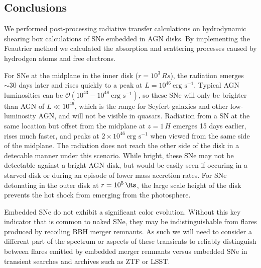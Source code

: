

\subsection{Conclusions} \label{sec:conclusion}

We performed post-processing radiative transfer calculations on hydrodynamic shearing box calculations of SNe embedded in AGN disks.
By implementing the Feautrier method we calculated the absorption and scattering processes caused by hydrodgen atoms and free electrons.

For SNe at the midplane in the inner disk ($r=10^3\,Rs$), the radiation emerges $\sim30$ days later and rises quickly to a peak at $L=10^{46}\ \text{erg s}^{-1}$.
Typical AGN luminosities can be $\mathcal{O}(10^{43}-10^{48}\ \text{erg s}^{-1})$, so these SNe will only be brighter than AGN of $L\ll10^{46}$, which is the range for Seyfert galaxies and other low-luminosity AGN, and will not be visible in quasars.
Radiation from a SN at the same location but offset from the midplane at $z=1\,H$ emerges 15 days earlier, rises much faster, and peaks at $2 \times 10^{46}\ \text{erg s}^{-1}$ when viewed from the same side of the midplane.
The radiation does not reach the other side of the disk in a detecable manner under this scenario.
While bright, these SNe may not be detectable against a bright AGN disk, but would be easily seen if occuring in a starved disk or during an episode of lower mass accretion rates.
For SNe detonating in the outer disk at $r=10^5\,\Rs$, the large scale height of the disk prevents the hot shock from emerging from the photosphere.

Embedded SNe do not exhibit a significant color evolution.
Without this key indicator that is common to naked SNe, they may be indistinguishable from flares produced by recoiling BBH merger remnants.
As such we will need to consider a different part of the spectrum or aspects of these transients to reliably distinguish between flares emitted by embedded merger remnants versus embedded SNe in transient searches and archives such as ZTF or LSST.

